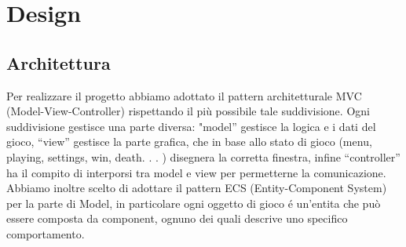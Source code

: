 \documentclass[a4paper,12pt]{report}
\begin{document}
\chapter{Design}

\section{Architettura}
Per realizzare il progetto abbiamo adottato il pattern architetturale MVC (Model-View-Controller) rispettando il più possibile tale suddivisione. 
Ogni suddivisione gestisce una parte diversa: "model” gestisce la logica e i dati del gioco, “view” gestisce la parte grafica, che in base allo stato di gioco (menu, playing, settings, win, death. . . ) disegnera la corretta finestra, infine “controller” ha il compito di interporsi tra model e view per permetterne la comunicazione. 
Abbiamo inoltre scelto di adottare il pattern ECS (Entity-Component System) per la parte di Model, in particolare ogni oggetto di gioco é un’entita che può essere composta da component, ognuno dei quali descrive uno specifico comportamento. 
\end{document}
